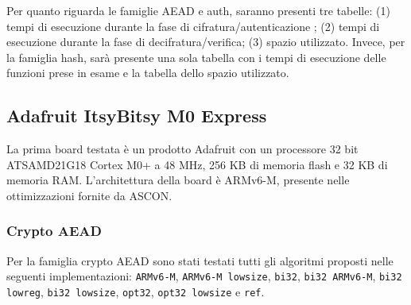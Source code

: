 \noindent Per quanto riguarda le famiglie AEAD e auth, saranno presenti tre tabelle: (1) tempi di esecuzione durante la fase di cifratura/autenticazione ; (2) tempi di esecuzione durante la fase di decifratura/verifica; (3) spazio utilizzato. Invece, per la famiglia hash, sarà presente una sola tabella con i tempi di esecuzione delle funzioni prese in esame e la tabella dello spazio utilizzato.

\subsection{Adafruit ItsyBitsy M0 Express}

La prima board testata è un prodotto Adafruit con un processore 32 bit ATSAMD21G18 Cortex M0+ a 48 MHz, 256 KB di memoria flash e 32 KB di memoria RAM\cite{adafruit}. L'architettura della board è ARMv6-M, presente nelle ottimizzazioni fornite da ASCON\cite{arm}.

\subsubsection{Crypto AEAD}

Per la famiglia crypto AEAD sono stati testati tutti gli algoritmi proposti nelle seguenti implementazioni: \texttt{ARMv6-M}, \texttt{ARMv6-M lowsize}, \texttt{bi32}, \texttt{bi32 ARMv6-M}, \texttt{bi32 lowreg}, \texttt{bi32 lowsize}, \texttt{opt32}, \texttt{opt32 lowsize} e \texttt{ref}.

